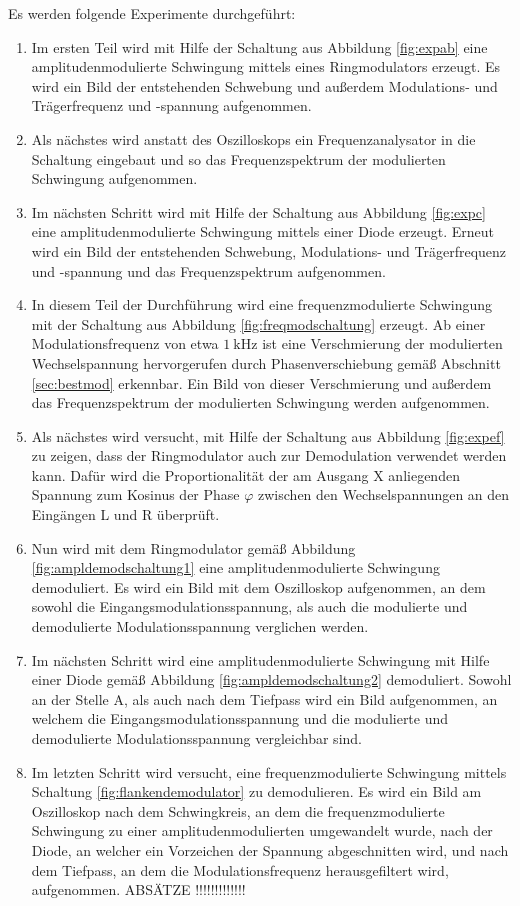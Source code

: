 Es werden folgende Experimente durchgeführt:
\begin{enumerate}
  \item Im ersten Teil wird mit Hilfe der Schaltung aus Abbildung \ref{fig:expab} eine
  amplitudenmodulierte Schwingung mittels eines Ringmodulators erzeugt. Es wird ein
  Bild der entstehenden Schwebung und außerdem Modulations- und Trägerfrequenz und -spannung
  aufgenommen.
  \item Als nächstes wird anstatt des Oszilloskops ein Frequenzanalysator in die Schaltung eingebaut
  und so das Frequenzspektrum der modulierten Schwingung aufgenommen.
  \item Im nächsten Schritt wird mit Hilfe der Schaltung aus Abbildung \ref{fig:expc} eine amplitudenmodulierte Schwingung
  mittels einer Diode erzeugt. Erneut wird ein Bild der entstehenden Schwebung, Modulations- und Trägerfrequenz und -spannung und
  das Frequenzspektrum aufgenommen.
  \item In diesem Teil der Durchführung wird eine frequenzmodulierte Schwingung mit der Schaltung aus Abbildung \ref{fig:freqmodschaltung}
  erzeugt. Ab einer Modulationsfrequenz von etwa $\SI{1}{\kilo\hertz}$ ist eine Verschmierung der modulierten Wechselspannung hervorgerufen
  durch Phasenverschiebung gemäß Abschnitt \ref{sec:bestmod} erkennbar. Ein Bild von dieser Verschmierung und außerdem das Frequenzspektrum
  der modulierten Schwingung werden aufgenommen.
  \item Als nächstes wird versucht, mit Hilfe der Schaltung aus Abbildung \ref{fig:expef} zu zeigen, dass der Ringmodulator
  auch zur Demodulation verwendet werden kann. Dafür wird die Proportionalität der am Ausgang X anliegenden Spannung zum
  Kosinus der Phase $\varphi$ zwischen den Wechselspannungen an den Eingängen L und R überprüft.
  \item Nun wird mit dem Ringmodulator gemäß Abbildung \ref{fig:ampldemodschaltung1} eine amplitudenmodulierte Schwingung
  demoduliert. Es wird ein Bild mit dem Oszilloskop aufgenommen, an dem sowohl die Eingangsmodulationsspannung, als auch die
  modulierte und demodulierte Modulationsspannung verglichen werden.
  \item Im nächsten Schritt wird eine amplitudenmodulierte Schwingung mit Hilfe einer Diode gemäß Abbildung \ref{fig:ampldemodschaltung2}
  demoduliert. Sowohl an der Stelle A, als auch nach dem Tiefpass wird ein Bild aufgenommen, an welchem die Eingangsmodulationsspannung und
  die modulierte und demodulierte Modulationsspannung vergleichbar sind.
  \item Im letzten Schritt wird versucht, eine frequenzmodulierte Schwingung mittels Schaltung \ref{fig:flankendemodulator} zu demodulieren.
  Es wird ein Bild am Oszilloskop nach dem Schwingkreis, an dem die frequenzmodulierte Schwingung zu einer amplitudenmodulierten umgewandelt
  wurde, nach der Diode, an welcher ein Vorzeichen der Spannung abgeschnitten wird, und nach dem Tiefpass, an dem die Modulationsfrequenz
  herausgefiltert wird, aufgenommen. ABSÄTZE !!!!!!!!!!!!!
\end{enumerate}
